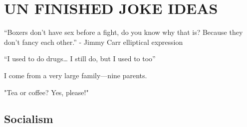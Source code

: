 


















\newpage
\section{UN FINISHED JOKE IDEAS}
``Boxers don’t have sex before a fight, do you know why that is? Because they don’t fancy each other.'' - Jimmy Carr
elliptical expression

 
``I used to do drugs… I still do, but I used to too''

I come from a very large family—nine parents.



"Tea or coffee? Yes, please!"

\subsection{Socialism}

